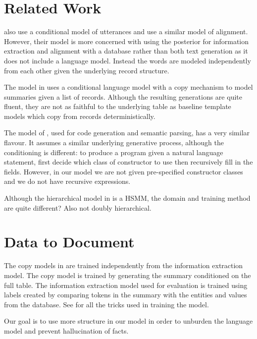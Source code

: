 \documentclass{article}
\begin{document}
\section{Related Work}
\citet{liang2009semalign} also use a conditional model of utterances and use a similar model of alignment.
However, their model is more concerned with using the posterior for information extraction and 
alignment with a database rather than both text generation as it does not include a language model. 
Instead the words are modeled independently from each other given the underlying record structure.

The model in \citet{wiseman2017d2t} uses a conditional language model with a copy mechanism
to model summaries given a list of records.
Although the resulting generations are quite fluent, they are not
as faithful to the underlying table as baseline template models which copy from
records deterministically.

The model of \citet{rabinovich17codegen}, used for code generation and semantic parsing,
has a very similar flavour.
It assumes a similar underlying generative process, although the conditioning is different:
to produce a program given a natural language statement,
first decide which class of constructor to use then recursively fill in the fields.
However, in our model we are not given pre-specified constructor classes and
we do not have recursive expressions.

Although the hierarchical model in \citet{yarats2017dialogue} is a HSMM,
the domain and training method are quite different?
Also not doubly hierarchical. %

\section{Data to Document}
The copy models in \citet{wiseman2017d2t} are trained independently from the
information extraction model. 
The copy model is trained by generating the summary conditioned on the full table.
The information extraction model used for evaluation is trained using labels
created by comparing tokens in the summary with the entities and values from the database.
See \citet{wiseman2017d2t} for all the tricks used in training the model.

Our goal is to use more structure in our model in order to unburden the language model
and prevent hallucination of facts.
\end{document}
